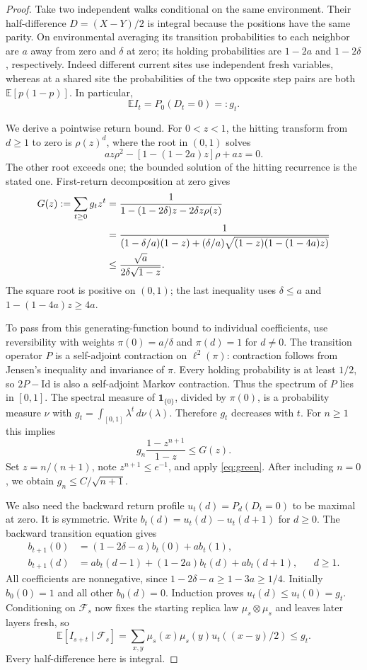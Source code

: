 \documentclass[11pt]{article}
\newcommand{\EE}{\mathbb E}
\newcommand{\one}{\mathbf 1}
\newcommand{\cF}{\mathcal F}
\begin{document}
\begin{proof}
Take two independent walks conditional on the same environment.
Their half-difference $D=(X-Y)/2$ is integral because the positions
have the same parity. On environmental averaging its transition
probabilities to each neighbor are $a$ away from zero and $\delta$
at zero; its holding probabilities are $1-2a$ and $1-2\delta$,
respectively. Indeed different current sites use independent fresh
variables, whereas at a shared site the probabilities of the two
opposite step pairs are both $\EE[p(1-p)]$. In particular,
\[
              \EE I_t=P_0(D_t=0)=:g_t .
\]

We derive a pointwise return bound. For $0<z<1$, the hitting
transform from $d\geq1$ to zero is $\rho(z)^d$, where the root in
$(0,1)$ solves
\[
 az\rho^2-[1-(1-2a)z]\rho+az=0.
\]
The other root exceeds one; the bounded solution of the hitting
recurrence is the stated one. First-return decomposition at zero gives
\begin{align}
 G(z):=\sum_{t\geq0}g_tz^t
 &=\frac{1}{1-(1-2\delta)z-2\delta z\rho(z)}\notag\\
 &=\frac{1}{
 (1-\delta/a)(1-z)+(\delta/a)
       \sqrt{(1-z)(1-(1-4a)z)}}\notag\\
 &\leq \frac{\sqrt a}{2\delta\sqrt{1-z}} .\label{eq:green}
\end{align}
The square root is positive on $(0,1)$; the last inequality uses
$\delta\leq a$ and $1-(1-4a)z\geq4a$.

To pass from this generating-function bound to individual coefficients,
use reversibility with weights $\pi(0)=a/\delta$ and $\pi(d)=1$
for $d\ne0$. The transition operator $P$ is a self-adjoint
contraction on $\ell^2(\pi)$: contraction follows from Jensen's
inequality and invariance of $\pi$. Every holding probability is
at least $1/2$, so $2P-\mathrm{Id}$ is also a self-adjoint Markov
contraction. Thus the spectrum of $P$ lies in $[0,1]$.
The spectral measure of $\one_{\{0\}}$, divided by $\pi(0)$,
is a probability measure $\nu$ with
$g_t=\int_{[0,1]}\lambda^t\,d\nu(\lambda)$.
Therefore $g_t$ decreases with $t$. For $n\geq1$ this implies
\[
 g_n\frac{1-z^{n+1}}{1-z}\leq G(z).
\]
Set $z=n/(n+1)$, note $z^{n+1}\leq e^{-1}$, and apply
\eqref{eq:green}. After including $n=0$, we obtain
$g_n\leq C/\sqrt{n+1}$.

We also need the backward return profile
$u_t(d)=P_d(D_t=0)$ to be maximal at zero.
It is symmetric. Write $b_t(d)=u_t(d)-u_t(d+1)$ for $d\geq0$.
The backward transition equation gives
\begin{align*}
 b_{t+1}(0)&=(1-2\delta-a)b_t(0)+a b_t(1),\\
 b_{t+1}(d)&=a b_t(d-1)+(1-2a)b_t(d)+a b_t(d+1),
                       &&d\geq1.
\end{align*}
All coefficients are nonnegative, since
$1-2\delta-a\geq1-3a\geq1/4$.
Initially $b_0(0)=1$ and all other $b_0(d)=0$.
Induction proves $u_t(d)\leq u_t(0)=g_t$.
Conditioning on $\cF_s$ now fixes the starting replica law
$\mu_s\otimes\mu_s$ and leaves later layers fresh, so
\[
 \EE[I_{s+t}\mid\cF_s]
    =\sum_{x,y}\mu_s(x)\mu_s(y)u_t((x-y)/2)\leq g_t.
\]
Every half-difference here is integral.


\end{proof}
\end{document}
